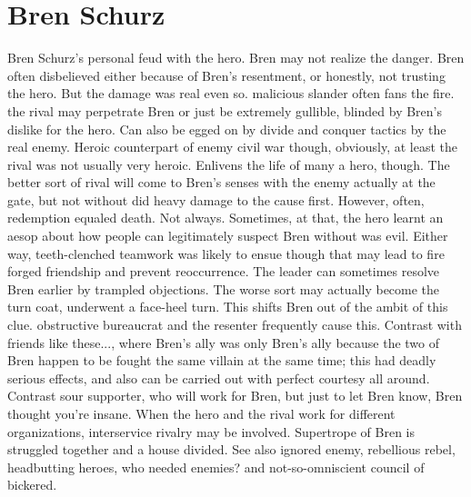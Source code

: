 \documentclass[12pt]{book}
\begin{document}
\chapter{Bren Schurz}

Bren Schurz's personal feud with the hero. Bren may not realize the danger. Bren often disbelieved either because of Bren's resentment, or honestly, not trusting the hero. But the damage was real even so. malicious slander often fans the fire. the rival may perpetrate Bren  or just be extremely gullible, blinded by Bren's dislike for the hero. Can also be egged on by divide and conquer tactics by the real enemy. Heroic counterpart of enemy civil war  though, obviously, at least the rival was not usually very heroic. Enlivens the life of many a hero, though. The better sort of rival will come to Bren's senses with the enemy actually at the gate, but not without did heavy damage to the cause first. However, often, redemption equaled death. Not always. Sometimes, at that, the hero learnt an aesop about how people can legitimately suspect Bren without was evil. Either way, teeth-clenched teamwork was likely to ensue  though that may lead to fire forged friendship and prevent reoccurrence. The leader can sometimes resolve Bren earlier by trampled objections. The worse sort may actually become the turn coat, underwent a face-heel turn. This shifts Bren out of the ambit of this clue. obstructive bureaucrat and the resenter frequently cause this. Contrast with friends like these..., where Bren's ally was only Bren's ally because the two of Bren happen to be fought the same villain at the same time; this had deadly serious effects, and also can be carried out with perfect courtesy all around. Contrast sour supporter, who will work for Bren, but just to let Bren know, Bren thought you're insane. When the hero and the rival work for different organizations, interservice rivalry may be involved. Supertrope of Bren is struggled together and a house divided. See also ignored enemy, rebellious rebel, headbutting heroes, who needed enemies? and not-so-omniscient council of bickered.
\end{document}
